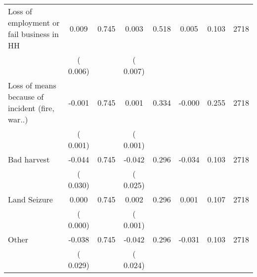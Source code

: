 \begin{tabular}{l*{7}{c}}
 Loss of employment or fail business in HH       &              0.009       &        0.745  &              0.003       &        0.518  &              0.005       &              0.103 &  2718 \\ 
                       &       (       0.006)             &                               &       (       0.007)                     &                               &                                               &                                &                      \\ 

 Loss of means because of incident (fire, war..)       &             -0.001       &        0.745  &              0.001       &        0.334  &             -0.000       &              0.255 &  2718 \\ 
                       &       (       0.001)             &                               &       (       0.001)                     &                               &                                               &                                &                      \\ 

 Bad harvest       &             -0.044       &        0.745  &             -0.042       &        0.296  &             -0.034       &              0.103 &  2718 \\ 
                       &       (       0.030)             &                               &       (       0.025)                     &                               &                                               &                                &                      \\ 

 Land Seizure       &              0.000       &        0.745  &              0.002       &        0.296  &              0.001       &              0.107 &  2718 \\ 
                       &       (       0.000)             &                               &       (       0.001)                     &                               &                                               &                                &                      \\ 

 Other       &             -0.038       &        0.745  &             -0.042       &        0.296  &             -0.031       &              0.103 &  2718 \\ 
                       &       (       0.029)             &                               &       (       0.024)                     &                               &                                               &                                &                      \\ 

\hline \end{tabular}